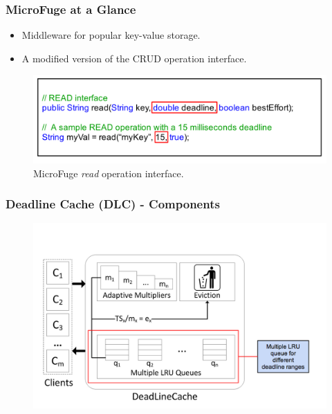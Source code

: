 \documentclass{beamer}
\newcommand{\myv}{\vspace{3 mm}}
\begin{document}
\begin{frame}
  \frametitle{MicroFuge at a Glance}
  \begin{itemize}
  \item Middleware for popular key-value storage.
    \myv
  \item A modified version of the CRUD operation interface.
  \end{itemize}
  \begin{figure}
\vspace{-5 mm}
  \includegraphics[scale=0.19]{img/MicroFuge_protocol.png}
  \caption{MicroFuge \textit{read} operation interface.}
  \end{figure}
\end{frame}

\begin{frame}
  \frametitle{Deadline Cache (DLC) - Components}
  \begin{figure}
    \begin{center}
      \centerline{\includegraphics[scale=0.35]{img/DLC_ARC_1.png}}
    \end{center}
  \end{figure}
\end{frame}
\end{document}
